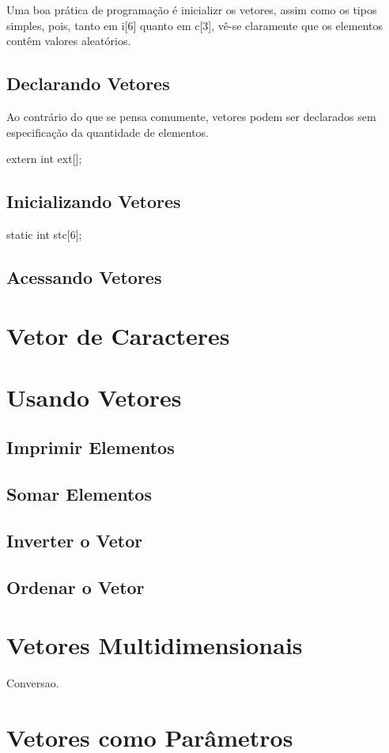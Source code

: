 Uma boa prática de programação é inicializr os vetores, assim como os tipos simples, pois, tanto em i[6] quanto em c[3], vê-se claramente que os elementos contêm valores aleatórios.

\subsection{Declarando Vetores}

Ao contrário do que se pensa comumente, vetores podem ser declarados sem especificação da quantidade de elementos.

\begin{ccode}
  extern int ext[];
\end{ccode}

\subsection{Inicializando Vetores}

\begin{ccode}
  static int stc[6];
\end{ccode}

\subsection{Acessando Vetores}

\section{Vetor de Caracteres}

\section{Usando Vetores}
\subsection{Imprimir Elementos}
\subsection{Somar Elementos}
\subsection{Inverter o Vetor}
\subsection{Ordenar o Vetor}

\section{Vetores Multidimensionais}
Conversao.

\section{Vetores como Parâmetros}

